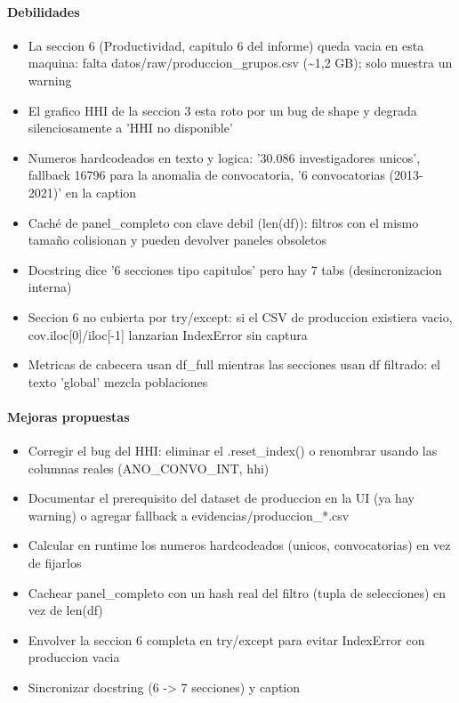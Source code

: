 \paragraph{Debilidades}
\begin{itemize}
  \item La seccion 6 (Productividad, capitulo 6 del informe) queda vacia en esta maquina: falta datos/raw/produccion\_grupos.csv (\textasciitilde{}1,2 GB); solo muestra un warning
  \item El grafico HHI de la seccion 3 esta roto por un bug de shape y degrada silenciosamente a 'HHI no disponible'
  \item Numeros hardcodeados en texto y logica: '30.086 investigadores unicos', fallback 16796 para la anomalia de convocatoria, '6 convocatorias (2013-2021)' en la caption
  \item Caché de panel\_completo con clave debil (len(df)): filtros con el mismo tamaño colisionan y pueden devolver paneles obsoletos
  \item Docstring dice '6 secciones tipo capitulos' pero hay 7 tabs (desincronizacion interna)
  \item Seccion 6 no cubierta por try/except: si el CSV de produccion existiera vacio, cov.iloc[0]/iloc[-1] lanzarian IndexError sin captura
  \item Metricas de cabecera usan df\_full mientras las secciones usan df filtrado: el texto 'global' mezcla poblaciones
\end{itemize}

\paragraph{Mejoras propuestas}
\begin{itemize}
  \item Corregir el bug del HHI: eliminar el .reset\_index() o renombrar usando las columnas reales (ANO\_CONVO\_INT, hhi)
  \item Documentar el prerequisito del dataset de produccion en la UI (ya hay warning) o agregar fallback a evidencias/produccion\_*.csv
  \item Calcular en runtime los numeros hardcodeados (unicos, convocatorias) en vez de fijarlos
  \item Cachear panel\_completo con un hash real del filtro (tupla de selecciones) en vez de len(df)
  \item Envolver la seccion 6 completa en try/except para evitar IndexError con produccion vacia
  \item Sincronizar docstring (6 -> 7 secciones) y caption
\end{itemize}

